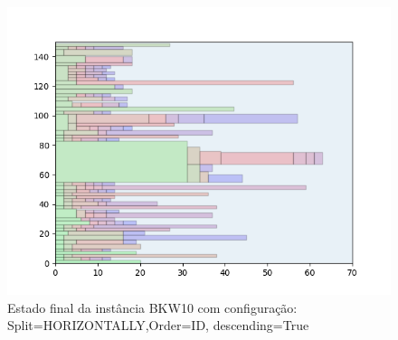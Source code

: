 \begin{figure}[H]
    \centering
    \caption[]{Estado final da instância BKW10 com configuração: Split=HORIZONTALLY,Order=ID, descending=True}
    \label{fig:bkw10-horizontally-id-true}
    \includegraphics[scale=0.5]{output/figures/bkw/bkw10/horizontally/id/true/000}
\end{figure}